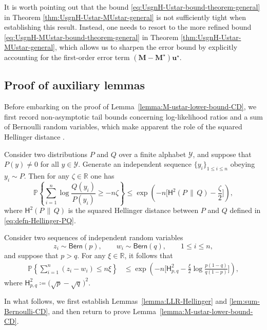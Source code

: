 \begin{remark}
	It is worth pointing out that the bound \eqref{eq:UsgnH-Ustar-bound-theorem-general} in Theorem \ref{thm:UsgnH-Ustar-MUstar-general} is not sufficiently tight when establishing this result. 
	Instead, one needs to resort to the more refined bound \eqref{eq:UsgnH-MUstar-bound-theorem-general} in Theorem \ref{thm:UsgnH-Ustar-MUstar-general}, 
	which allows us to sharpen the error bound by explicitly accounting for the first-order error term $(\bm{M}-\bm{M}^{\star})\bm{u}^{\star}$. 
\end{remark}




 


\subsection{Proof of auxiliary lemmas}
\label{sec:proof-auxiliary-CD}

Before embarking on the proof of Lemma~\ref{lemma:M-ustar-lower-bound-CD}, we first record non-asymptotic tail bounds concerning log-likelihood ratios and a sum of Bernoulli random variables, which make apparent the role of the squared Hellinger distance \citep{tsybakov2009nonparm}.
%
\begin{lemma}
	\label{lemma:LLR-Hellinger}
	Consider two distributions $P$ and $Q$ over a finite alphabet $\mathcal{Y}$, and suppose that $P(y)\neq 0$ for all $y\in \mathcal{Y}$. Generate an independent sequence $\{y_i\}_{1\leq i\leq n}$ obeying $y_i \sim P$. Then for any $\zeta\in \mathbb{R}$ one has
\begin{equation}
\mathbb{P}\left\{ \sum_{i=1}^{n}\log\frac{Q(y_{i})}{P(y_{i})}\geq-n\zeta\right\} \leq\exp\left(-n\Big[\mathsf{H}^2(P\,\|\,Q)-\frac{\zeta}{2}\Big]\right),
\label{eq:prob-log-PQ-exp-Hel}
\end{equation}
%
where $\mathsf{H}^2(P\,\|\,Q)$ is the squared Hellinger distance between $P$ and $Q$ defined in \eqref{eq:defn-Hellinger-PQ}.
\end{lemma}
%
%
\begin{lemma}
\label{lem:sum-Bernoulli-CD}
%
Consider two sequences of independent random variables
%
\[
z_{i}\sim\mathsf{Bern}(p),\qquad w_{i}\sim\mathsf{Bern}(q),\qquad1\leq i\leq n,
\]
%
and suppose that $p>q$. For any $\xi\in \mathbb{R}$, it follows that
%
\begin{align*}
\mathbb{P}\left\{ \sum_{i=1}^{n}(z_{i}-w_i) \leq n\xi\right\}  & \leq\exp\left(-n\Big[\mathsf{H}_{p,q}^{2}-\frac{\xi}{2}\log\frac{p(1-q)}{q(1-p)}\Big]\right) ,
\end{align*}
%
where $\mathsf{H}_{p,q}^{2}  \coloneqq  \big(\sqrt{p}-\sqrt{q} \, \big)^{2}$.
%
% 
\end{lemma}
%
In what follows, we first establish Lemmas~\ref{lemma:LLR-Hellinger} and \ref{lem:sum-Bernoulli-CD}, and then return to prove Lemma~\ref{lemma:M-ustar-lower-bound-CD}. 



